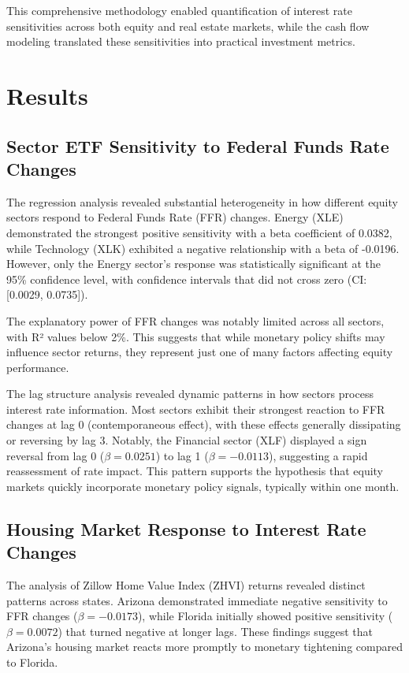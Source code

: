 \documentclass[12pt, stu, abstract]{apa7}
\begin{document}
This comprehensive methodology enabled quantification of interest rate sensitivities across both equity and real estate markets, while the cash flow modeling translated these sensitivities into practical investment metrics.

\section{Results}
\subsection{Sector ETF Sensitivity to Federal Funds Rate Changes}

The regression analysis revealed substantial heterogeneity in how different equity sectors respond to Federal Funds Rate (FFR) changes. Energy (XLE) demonstrated the strongest positive sensitivity with a beta coefficient of 0.0382, while Technology (XLK) exhibited a negative relationship with a beta of -0.0196. However, only the Energy sector's response was statistically significant at the 95\% confidence level, with confidence intervals that did not cross zero (CI: [0.0029, 0.0735]).

The explanatory power of FFR changes was notably limited across all sectors, with R² values below 2\%. This suggests that while monetary policy shifts may influence sector returns, they represent just one of many factors affecting equity performance.

The lag structure analysis revealed dynamic patterns in how sectors process interest rate information. Most sectors exhibit their strongest reaction to FFR changes at lag 0 (contemporaneous effect), with these effects generally dissipating or reversing by lag 3. Notably, the Financial sector (XLF) displayed a sign reversal from lag 0 ($\beta = 0.0251$) to lag 1 ($\beta = -0.0113$), suggesting a rapid reassessment of rate impact. This pattern supports the hypothesis that equity markets quickly incorporate monetary policy signals, typically within one month.

\subsection{Housing Market Response to Interest Rate Changes}

The analysis of Zillow Home Value Index (ZHVI) returns revealed distinct patterns across states. Arizona demonstrated immediate negative sensitivity to FFR changes ($\beta = -0.0173$), while Florida initially showed positive sensitivity ($\beta = 0.0072$) that turned negative at longer lags. These findings suggest that Arizona's housing market reacts more promptly to monetary tightening compared to Florida.
\end{document}
